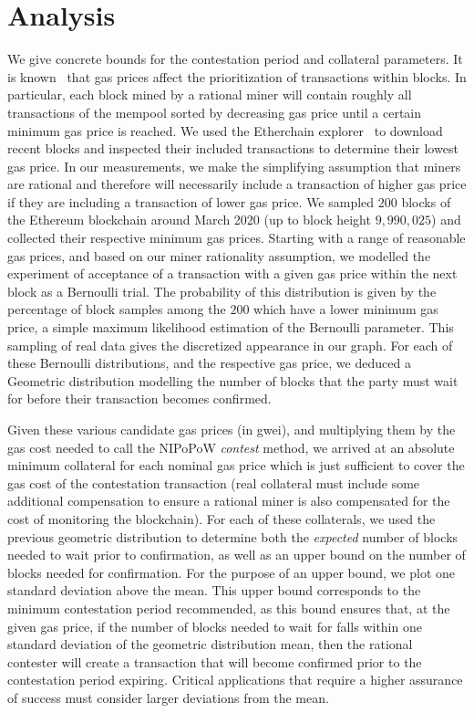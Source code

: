 \section{Analysis} We give concrete bounds for the contestation
period and collateral parameters. It is known~\cite{wood} that gas prices
affect the prioritization of transactions within blocks. In particular, each
block mined by a rational miner will contain roughly all transactions of the
mempool sorted by decreasing gas price until a certain minimum gas price is
reached. We used the Etherchain explorer~\cite{etherchain} to download recent
blocks and inspected their included transactions to determine their lowest gas
price. In our measurements, we make the simplifying assumption that miners are
rational and therefore will necessarily include a transaction of higher gas
price if they are including a transaction of lower gas price.  We sampled $200$
blocks of the Ethereum blockchain around March 2020 (up to block height
$9{,}990{,}025$) and collected their respective minimum gas prices.  Starting
with a range of reasonable gas prices, and based on our miner rationality
assumption, we modelled the experiment of acceptance of a transaction with a
given gas price within the next block as a Bernoulli trial.  The probability of
this distribution is given by the percentage of block samples among the $200$
which have a lower minimum gas price, a simple maximum likelihood estimation of
the Bernoulli parameter.  This sampling of real data gives the discretized
appearance in our graph.  For each of these Bernoulli distributions, and the
respective gas price, we deduced a Geometric distribution modelling the number
of blocks that the party must wait for before their transaction becomes
confirmed.

Given these various candidate gas prices (in gwei), and multiplying them by the
gas cost needed to call the NIPoPoW \emph{contest} method, we arrived at an
absolute minimum collateral for each nominal gas price which is just sufficient
to cover the gas cost of the contestation transaction (real collateral must
include some additional compensation to ensure a rational miner is also
compensated for the cost of monitoring the blockchain). For each of these
collaterals, we used the previous geometric distribution to determine both the
\emph{expected} number of blocks needed to wait prior to confirmation, as well
as an upper bound on the number of blocks needed for confirmation. For the
purpose of an upper bound, we plot one standard deviation above the mean. This
upper bound corresponds to the minimum contestation period recommended, as this
bound ensures that, at the given gas price, if the number of blocks needed to
wait for falls within one standard deviation of the geometric distribution
mean, then the rational contester will create a transaction that will become
confirmed prior to the contestation period expiring. Critical applications that
require a higher assurance of success must consider larger deviations from the
mean.

